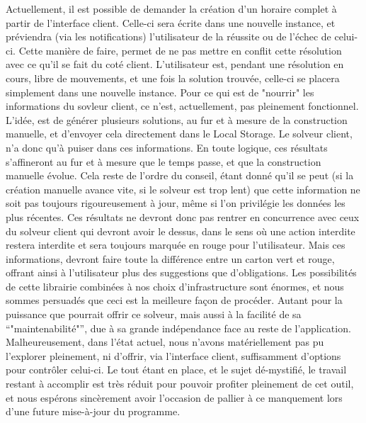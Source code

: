 Actuellement, il est possible de demander la création d'un horaire complet à partir de l'interface client. Celle-ci sera écrite dans une nouvelle instance, et préviendra (via les notifications) l'utilisateur de la réussite ou de l'échec de celui-ci.  Cette manière de faire, permet de ne pas mettre en conflit cette résolution avec ce qu'il se fait du coté client. L'utilisateur est, pendant une résolution en cours, libre de mouvements, et une fois la solution trouvée, celle-ci se placera simplement dans une nouvelle instance.
Pour ce qui est de "nourrir" les informations du sovleur client, ce n'est, actuellement, pas pleinement fonctionnel. L'idée, est de générer plusieurs solutions, 
au fur et à mesure de la construction manuelle, et d'envoyer cela directement dans le Local Storage. Le solveur client, n'a donc qu'à puiser dans ces informations.
En toute logique, ces résultats s'affineront au fur et à mesure que le temps passe, et que la construction manuelle évolue. Cela reste de l'ordre du conseil, étant donné qu'il se peut (si la création manuelle avance vite, si le solveur est trop lent) que cette information ne soit pas toujours rigoureusement à jour, même si l'on privilégie les données les plus récentes.  Ces résultats ne devront donc pas rentrer en concurrence avec ceux du solveur client qui devront avoir le dessus, dans le sens où une action interdite restera interdite et sera toujours marquée en rouge pour l'utilisateur. 
Mais ces informations, devront faire toute la différence entre un carton vert et rouge, offrant ainsi à l'utilisateur plus des suggestions que d'obligations. 
\newline
\indent
Les possibilités de cette librairie combinées à nos choix d'infrastructure sont énormes, et nous sommes persuadés que ceci est la meilleure façon de procéder. Autant pour la puissance que pourrait offrir ce solveur, mais aussi à la facilité de sa \enquote{"maintenabilité"}, due à sa grande indépendance face au reste de l'application.
Malheureusement, dans l'état actuel, nous n'avons matériellement pas pu l'explorer pleinement, ni d'offrir, via l'interface client, suffisamment d'options pour contrôler celui-ci.
Le tout étant en place, et le sujet dé-mystifié, le travail restant à accomplir est très réduit pour pouvoir profiter pleinement de cet outil, et nous espérons sincèrement avoir l'occasion de pallier à ce manquement lors d'une future mise-à-jour du programme.
